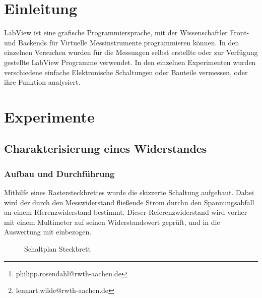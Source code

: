 \documentclass[12pt,twoside,a4paper]{scrartcl}
\author{Philipp Rosendahl Mat.-Nr: 378092\thanks{philipp.rosendahl@rwth-aachen.de}
		\and Lennart Wilde, Mat.-Nr: 381588\thanks{lennart.wilde@rwth-aachen.de}}
\begin{document}
\maketitle
\newpage

\tableofcontents
\newpage


\section{Einleitung}
  LabView ist eine grafische Programmiersprache, mit der Wissenschaftler Front- und Backends für Virtuelle Messinstrumente programmieren können.
	In den einzelnen Versuchen wurden für die Messungen selbst erstellte oder zur Verfügung gestellte LabView Programme verwendet. In den einzelnen Experimenten wurden verschiedene einfache Elektronische Schaltungen oder Bauteile vermessen, oder ihre Funktion analysiert.

	\section{Experimente}
		\subsection{Charakterisierung eines Widerstandes}

			\subsubsection{Aufbau und Durchführung}
				Mithilfe eines Rastersteckbrettes wurde die skizzerte Schaltung aufgebaut. Dabei wird der durch den Messwiderstand fließende Strom durchn den Spannungsabfall an einem Rferenzwiderstand bestimmt. Dieser Referenzwiderstand wird vorher mit einem Multimeter auf seinen Widerstandswert geprüft, und in die Auswertung mit einbezogen.

				\begin{figure}[H]
					\centering
					\caption{Schaltplan Steckbrett}
				\end{figure}
\end{document}
